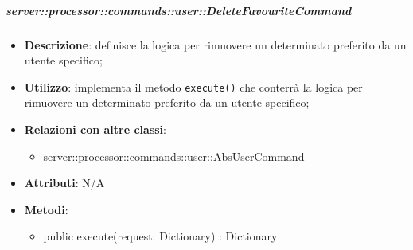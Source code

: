        \subparagraph{server::processor::commands::user::DeleteFavouriteCommand} %
        \label{subp:bdsm_app_server_processor_commands_user_deletefavouritecommand}
        \begin{itemize}
          \item \textbf{Descrizione}: definisce la logica per rimuovere un determinato preferito da un utente specifico;
          \item \textbf{Utilizzo}: implementa il metodo \texttt{execute()} che conterrà la logica per rimuovere un determinato preferito da un utente specifico;
          \item \textbf{Relazioni con altre classi}:
            \begin{itemize}
              \item server::processor::commands::user::AbsUserCommand
            \end{itemize}
			\item \textbf{Attributi}: N/A
			\item \textbf{Metodi}:
        	\begin{itemize}
          		\item public execute(request: Dictionary) : Dictionary
        	\end{itemize}
        \end{itemize}

